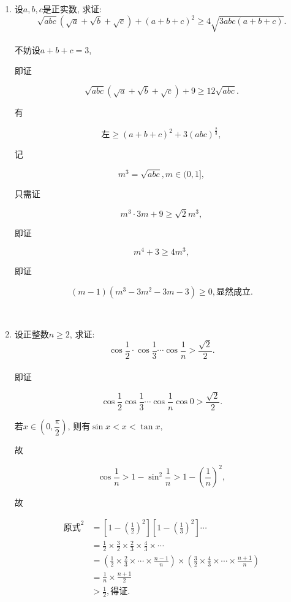 \documentclass[8pt]{article}
\begin{document}
\begin{enumerate}
		~\\

		\item 设$a, b, c$是正实数, 求证: $$\sqrt{abc} \left(\sqrt{a}+\sqrt{b}+\sqrt{c}\right)+(a+b+c)^2 \geq 4\sqrt{3abc(a+b+c)}.$$
			~\\

			不妨设$a+b+c=3$,

			即证

			$$\sqrt{abc}\left(\sqrt{a}+\sqrt{b}+\sqrt{c}\right)+9\geq 12\sqrt{abc}.$$

			有

			$$\text{左} \geq (a+b+c)^2 + 3(abc)^{\frac{2}{3}},$$

			记

			$$m^3 = \sqrt{abc}, m \in (0, 1],$$

			只需证

			$$m^3 \cdot 3m + 9 \geq \sqrt{2} m^3,$$

			即证

			$$m^4 + 3 \geq 4m^3,$$

			即证

			$$(m-1)(m^3-3m^2-3m-3)\geq 0, \text{显然成立.}$$

		~\\

		\item 设正整数$n \geq 2$, 求证: $$\cos \frac{1}{2} \cdot \cos \frac{1}{3} \cdots \cos \frac{1}{n} > \frac{\sqrt{2}}{2}.$$
			~\\

			即证

			$$\cos \frac{1}{2} \cos \frac{1}{3} \cdots \cos \frac{1}{n} \cos 0 > \frac{\sqrt{2}}{2}.$$

			若$x\in\left(0, \dfrac{\pi}{2}\right)$, 则有$\sin x < x < \tan x,$

			故

			$$\cos \frac{1}{n} > 1 - \sin^2 \frac{1}{n} > 1-\left(\frac{1}{n}\right)^2,$$

			故

			\begin{align*}
				\text{原式}^2 &= \left[1-\left(\frac{1}{2}\right)^2\right] \left[1-\left(\frac{1}{3}\right)^2\right] \cdots\\
				&= \frac{1}{2} \times \frac{3}{2} \times \frac{2}{3} \times \frac{4}{3} \times \cdots\\
				&= \left(\frac{1}{2} \times \frac{2}{3} \times \cdots \times \frac{n-1}{n}\right)\times\left(\frac{3}{2} \times \frac{4}{3} \times \cdots \times \frac{n+1}{n} \right)\\
				&= \frac{1}{n} \times \frac{n+1}{2}\\
				&> \frac{1}{2}, \text{得证}.
			\end{align*}

	\end{enumerate}
\end{document}
